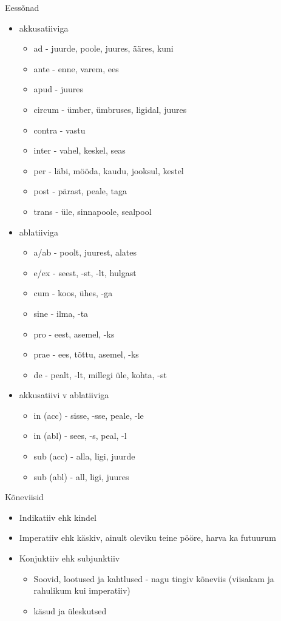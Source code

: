 \documentclass[12pt]{article}
\newenvironment{tiitel}
	{\begin{center}
	\bfseries
	\large
	}{
	\end{center}
	}
\begin{document}
\pagebreak
\begin{tiitel}
Eessõnad
\end{tiitel}
\begin{itemize}
 \item akkusatiiviga
 \begin{itemize}
  \item ad - juurde, poole, juures, ääres, kuni
  \item ante - enne, varem, ees
  \item apud - juures
  \item circum - ümber, ümbruses, ligidal, juures
  \item contra - vastu
  \item inter - vahel, keskel, seas
  \item per - läbi, mööda, kaudu, jooksul, kestel
  \item post - pärast, peale, taga
  \item trans - üle, sinnapoole, sealpool
 \end{itemize}
 \item ablatiiviga
 \begin{itemize}
  \item a/ab - poolt, juurest, alates
  \item e/ex - seest, -st, -lt, hulgast
  \item cum - koos, ühes, -ga
  \item sine - ilma, -ta
  \item pro - eest, asemel, -ks
  \item prae - ees, tõttu, asemel, -ks
  \item de - pealt, -lt, millegi üle, kohta, -st
 \end{itemize}
 \item akkusatiivi v ablatiiviga
 \begin{itemize}
  \item in (acc) - sisse, -sse, peale, -le
  \item in (abl) - sees, -s, peal, -l
  \item sub (acc) - alla, ligi, juurde
  \item sub (abl) - all, ligi, juures
 \end{itemize}
\end{itemize}
\pagebreak
\begin{tiitel}
Kõneviisid
\end{tiitel}
\begin{itemize}
\item Indikatiiv ehk kindel
\item Imperatiiv ehk käskiv, ainult oleviku teine pööre, harva ka futuurum
\item Konjuktiiv ehk subjunktiiv
\begin{itemize}
\item Soovid, lootused ja kahtlused - nagu tingiv kõneviis (viisakam ja rahulikum kui imperatiiv)
\item käsud ja üleskutsed
\end{itemize}
\end{itemize}
\end{document}
